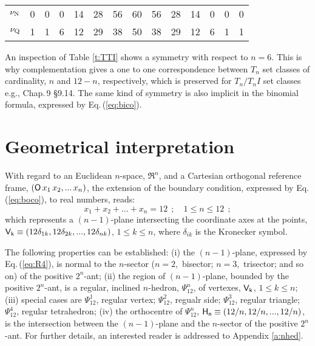 \documentclass[12pt,a4paper]{article}
\begin{document}
\begin{table}
\begin{center}
\begin{tabular}{|c|r|r|r|r|r|r|r|r|r|r|r|r|r|}
$\nu_{\rm N}$         & \phantom{$$}0          & 0 &  0                  & 14                  &  28                  &  56 &  60 &  56 &  28                  &  14                 &  0                  &  0 &  0                     \\
$\nu_{\rm Q}$         & \phantom{$$}1          & 1 &  6                  & 12                  &  29                  &  38 &  50 &  38 &  29                  &  12                 &  6                  &  1 &  1                     \\
\hline                            
\end{tabular}                     
\end{center}                      
\end{table}                       
%                                 

An inspection of Table \ref{t:TTI} shows a symmetry with respect to $n=6$.
This is why complementation gives a one to one correspondence between $T_n$
set classes of cardinality, $n$ and $12-n$, respectively, which is preserved
for $T_n/T_nI$ set classes e.g., \cite{Ben06} Chap.\,9 \S9.14.   The same
kind of symmetry is also implicit in the binomial formula, expressed by 
Eq.\,(\ref{eq:bico}). 

\section{Geometrical interpretation}\label{gein}

With regard to an Euclidean $n$-space, $\Re^n$, and a Cartesian orthogonal
reference frame,
$({\sf O}\,x_1\,x_2,...\,x_n)$, the extension of the boundary condition,
expressed by Eq.\,(\ref{eq:boco}), to real numbers, reads:
\begin{equation}
\label{eq:R4}
x_1+x_2+...+x_n=12~~;\quad1\le n\le12~~;
\end{equation}
which represents a $(n-1)$-plane intersecting the coordinate axes at the
points, ${\sf V_k}\equiv(12\delta_{1k},12\delta_{2k},...,12\delta_{nk})$,
$1\le k\le n$, where $\delta_{ik}$ is the Kronecker symbol.

The following properties can be established: (i) the $(n-1)$-plane, expressed
by Eq.\,(\ref{eq:R4}), is normal to the $n$-sector ($n=2,$ bisector; $n=3,$
trisector; and so on) of the positive $2^n$-ant; (ii) the region of
$(n-1)$-plane, bounded by the positive $2^n$-ant, is a regular, inclined
$n$-hedron, $\Psi_{12}^n$, of vertexes, ${\sf V_k}$, $1\le k\le n$; (iii)
special cases are $\Psi_{12}^1$, regular vertex; $\Psi_{12}^2$, regualr side;
$\Psi_{12}^3$, regular triangle; $\Psi_{12}^4$, regular tetrahedron; (iv)  the
orthocentre of $\Psi_{12}^n$, ${\sf H_n}\equiv(12/n,12/n,...,12/n)$, is the
intersection between the $(n-1)$-plane and the $n$-sector of the positive
$2^n$-ant.    For further details, an interested reader is addressed to
Appendix \ref{a:nhed}.
\end{document}
